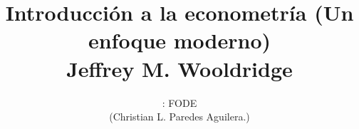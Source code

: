 \normalfont

\author{\Large : FODE \\ \small (Christian L. Paredes Aguilera.)}
\title{Introducción a la econometría (Un enfoque moderno)\\ \small Jeffrey M. Wooldridge}
\date{}
\pagestyle{empty}
\maketitle
\thispagestyle{empty}
\let\cleardoublepage\clearpage
\tableofcontents								%


 
\let\cleardoublepage\clearpage
